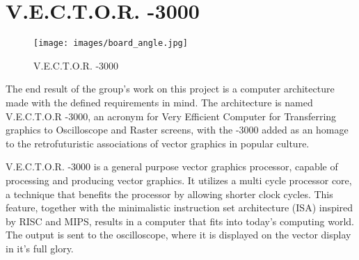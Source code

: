 \chapter{V.E.C.T.O.R. -3000}

\begin{figure}[H]
    \texttt{[image: images/board\_angle.jpg]}
    \caption{V.E.C.T.O.R. -3000}
    \label{fig:board-angle}
\end{figure}

The end result of the group's work on this project is a computer architecture made with the defined requirements in mind.
The architecture is named V.E.C.T.O.R -3000, an acronym for Very Efficient Computer for Transferring graphics to Oscilloscope and Raster screens, with the -3000 added as an homage to the retrofuturistic associations of vector graphics in popular culture.

V.E.C.T.O.R. -3000 is a general purpose vector graphics processor, capable of processing and producing vector graphics. 
It utilizes a multi cycle processor core, a technique that benefits the processor by allowing shorter clock cycles.
This feature, together with the minimalistic instruction set architecture (ISA) inspired by RISC\cite{risc} and MIPS\cite{mips}, results in a computer that fits into today's computing world.
The output is sent to the oscilloscope, where it is displayed on the vector display in it's full glory.
